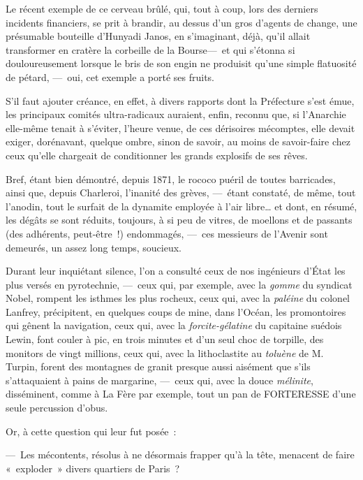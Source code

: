 \documentclass[french,twoside]{book} %
\newcommand{\bibl}[1]{{\RaggedLeft{#1}\par\bigskip}}
\begin{document}
\bibl{Le prince Kropotkine.}
\noindent Le récent exemple de ce cerveau brûlé, qui, tout à coup, lors des derniers incidents financiers, se prit à brandir, au dessus d’un gros d’agents de change, une présumable bouteille d’Hunyadi Janos, en s’imaginant, déjà, qu’il allait transformer en cratère la corbeille de la Bourse— et qui s’étonna si douloureusement lorsque le bris de son engin ne produisit qu’une simple flatuosité de pétard, — oui, cet exemple a porté ses fruits.\par
   S’il faut ajouter créance, en effet, à divers rapports dont la Préfecture s’est émue, les principaux comités ultra-radicaux auraient, enfin, reconnu que, si l’Anarchie elle-même tenait à s’éviter, l’heure venue, de ces dérisoires mécomptes, elle devait exiger, dorénavant, quelque ombre, sinon de savoir, au moins de savoir-faire chez ceux qu’elle chargeait de conditionner les grands explosifs de ses rêves.\par
Bref, étant bien démontré, depuis 1871, le rococo puéril de toutes barricades, ainsi que, depuis Charleroi, l’inanité des grèves, — étant constaté, de même, tout l’anodin, tout le surfait de la dynamite employée à l’air libre… et dont, en résumé, les dégâts se sont réduits, toujours, à si peu de vitres, de moellons et de passants (des adhérents, peut-être !) endommagés, — ces messieurs de l’Avenir sont demeurés, un assez long temps, soucieux.\par
Durant leur inquiétant silence, l’on a consulté ceux de nos ingénieurs d’État les plus versés en pyrotechnie, — ceux qui, par exemple, avec la \emph{gomme} du syndicat Nobel, rompent les isthmes   les plus rocheux, ceux qui, avec la \emph{paléine} du colonel Lanfrey, précipitent, en quelques coups de mine, dans l’Océan, les promontoires qui gênent la navigation, ceux qui, avec la \emph{forcite-gélatine} du capitaine suédois Lewin, font couler à pic, en trois minutes et d’un seul choc de torpille, des monitors de vingt millions, ceux qui, avec la lithoclastite au \emph{toluène} de M. Turpin, forent des montagnes de granit presque aussi aisément que s’ils s’attaquaient à pains de margarine, — ceux qui, avec la douce \emph{mélinite}, disséminent, comme à La Fère par exemple, tout un pan de FORTERESSE d’une seule percussion d’obus.\par
Or, à cette question qui leur fut posée :\par
— Les mécontents, résolus à ne désormais frapper qu’à la tête, menacent de faire « exploder » divers quartiers de Paris ?\par
\end{document}
